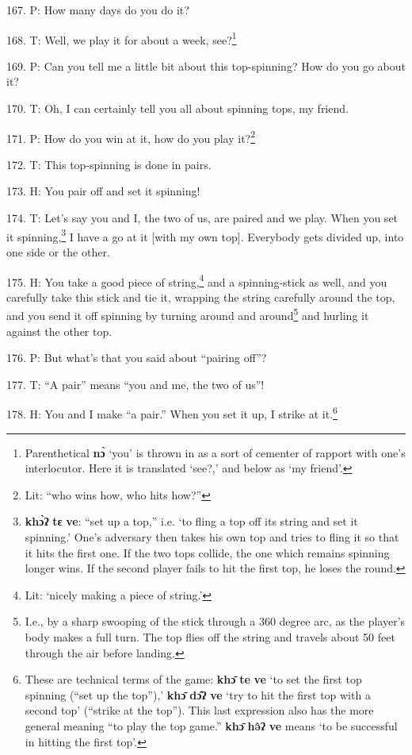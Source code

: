 167. P: How many days do you do it?

168. T: Well, we play it for about a week, see?\footnote{Parenthetical \textbf{nɔ̀} `you' is thrown in as a sort of cementer of rapport with one's interlocutor. Here it is translated `see?,' and below as `my friend'.}

169. P: Can you tell me a little bit about this top-spinning? How do you go about
it?

170. T: Oh, I can certainly tell you all about spinning tops, my friend.

171. P: How do you win at it, how do you play it?\footnote{Lit: ``who wins how, who hits how?''}

172. T: This top-spinning is done in pairs.

173. H: You pair off and set it spinning!

174. T: Let's say you and I, the two of us, are paired and we play. When you set
it spinning,\footnote{\textbf{khɔ̀ʔ} \textbf{tɛ} \textbf{ve}: ``set up a top,'' i.e. `to fling a top off its string and set it spinning.' One's adversary then takes his own top and tries to fling it so that it hits the first one. If the two tops collide, the one which remains spinning longer wins. If the second player fails to hit the first top, he loses the round.} I have a go at it [with my own top]. Everybody gets divided up,
into one side or the other.

175. H: You take a good piece of string,\footnote{Lit: `nicely making a piece of string.'} and a spinning-stick as well, and you
carefully take this stick and tie it, wrapping the string carefully around the
top, and you send it off spinning by turning around and around\footnote{I.e., by a sharp swooping of the stick through a 360 degree arc, as the player's body makes a full turn. The top flies off the string and travels about 50 feet through the air before landing.} and hurling
it against the other top.

176. P: But what's that you said about ``pairing off''?

177. T: ``A pair'' means ``you and me, the two of us''!

178. H:  You and I make ``a pair.''
When you set it up, I strike at it.\footnote{These are technical terms of the game: \textbf{khɔ̄} \textbf{te} \textbf{ve} `to set the first top spinning (``set up the top''),' \textbf{khɔ̄} \textbf{dɔ̂ʔ} \textbf{ve} `try to hit the first top with a second top' (``strike at the top''). This last expression also has the more general meaning ``to play the top game.'' \textbf{khɔ̄} \textbf{hə̂ʔ} \textbf{ve} means `to be successful in hitting the first top'.}

